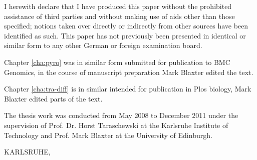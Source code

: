 


\begin{declaration}        %

  I herewith declare that I have produced this paper without the
  prohibited assistance of third parties and without making use of
  aids other than those specified; notions taken over directly or
  indirectly from other sources have been identified as such. This
  paper has not previously been presented in identical or similar form
  to any other German or foreign examination board.

  Chapter \ref{cha:pyro} was in similar form submitted for publication
  to BMC Genomics, in the course of manuscript preparation Mark
  Blaxter edited the text.
  
  Chapter \ref{cha:tra-diff} is in similar intended for publication in
  Plos biology, Mark Blaxter edited parts of the text.

  The thesis work was conducted from May 2008 to December 2011 under
  the supervision of Prof. Dr. Horst Taraschewski at the Karlsruhe
  Institute of Technology and Prof. Mark Blaxter at the University of
  Edinburgh.

\vspace{10mm}

KARLSRUHE, 


\end{declaration}



